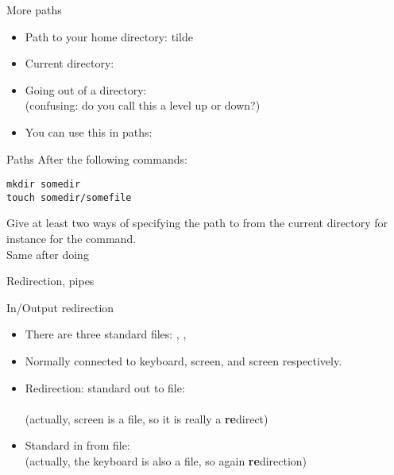 \documentclass[11pt,headernav]{beamer}
\begin{document}

\begin{numberedframe}{More paths}
  \label{sl-lnx:morepath}
  \begin{itemize}
  \item Path to your home directory: tilde
  \item Current directory:~
  \item Going out of a directory:~\\
    (confusing: do you call this a level up or down?)
  \item You can use this in paths: 
  \end{itemize}
\end{numberedframe}



\begin{exercise}{Paths}
  After the following commands:
\begin{verbatim}
mkdir somedir
touch somedir/somefile
\end{verbatim}
Give at least two ways of specifying the path to 
from the current directory
for instance for the  command.\\
Same after doing 
\end{exercise}

 {Redirection, pipes}

\begin{numberedframe}{In/Output redirection}
  \label{sl-lnx:redirect}
  \begin{itemize}
  \item There are three standard files: , , 
  \item Normally connected to keyboard, screen, and screen respectively.
  \item Redirection: standard out to file:\\
    \\
    (actually, screen is a file, so it is really a \textbf{re}direct)
  \item Standard in from file:
    \\
    (actually, the keyboard is also a file, so again \textbf{re}direction)
  \end{itemize}
\end{numberedframe}
\end{document}
